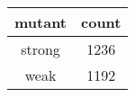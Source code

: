 
\begin{tabular}{cc}
\toprule
mutant & count\\
\midrule
strong & 1236\\
weak & 1192\\
\bottomrule
\end{tabular}
